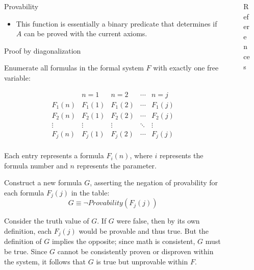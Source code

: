 \documentclass[final]{beamer} %
\newlength{\sepwidth}
\newlength{\colwidth}
\newcommand{\separatorcolumn}{\begin{column}{\sepwidth}\end{column}}
\begin{document}
\begin{frame}[t]
\begin{columns}[t]
\begin{column}{\colwidth}
\begin{block}{Provability}
\begin{itemize}
    \item This function is essentially a binary predicate that determines if $A$ can be proved with the current axioms.
    
    \end{itemize}

 \end{block}


 \begin{block}{Proof by diagonalization}

    
    Enumerate all formulas in the formal system $F$ with exactly one free variable:
    
    \[
    \begin{array}{c|c|c|c|c}
    & n=1 & n=2 & \cdots & n = j \\
    \hline
    F_1(n) & F_1(1) & F_1(2) & \cdots & F_1(j) \\
    F_2(n) & F_2(1) & F_2(2) & \cdots & F_2(j) \\
    \vdots & \vdots & \vdots & \ddots & \vdots \\
    F_j(n) & F_j(1) & F_j(2) & \cdots & F_j(j) \\
    \end{array}
    \]


Each entry represents a formula \( F_i(n) \), where \( i \) represents the formula number and \( n \) represents the parameter.

Construct a new formula $G$, asserting the negation of provability for each formula $F_j(j)$ in the table:
\[ G \equiv \neg Provability(F_j(j)) \]

Consider the truth value of $G$. If $G$ were false, then by its own definition, each $F_j(j)$ would be provable and thus true. But the definition of $G$ implies the opposite; since math is consistent, $G$ must be true. Since $G$ cannot be consistently proven or disproven within the system, it follows that $G$ is true but unprovable within $F$.
 
 \end{block}

\end{column}


\separatorcolumn

\begin{column}{\colwidth}


  \begin{block}{References}

    \nocite{*}
    \footnotesize{}

  \end{block}

\end{column}

\separatorcolumn
\end{columns}
\end{frame}
\end{document}
